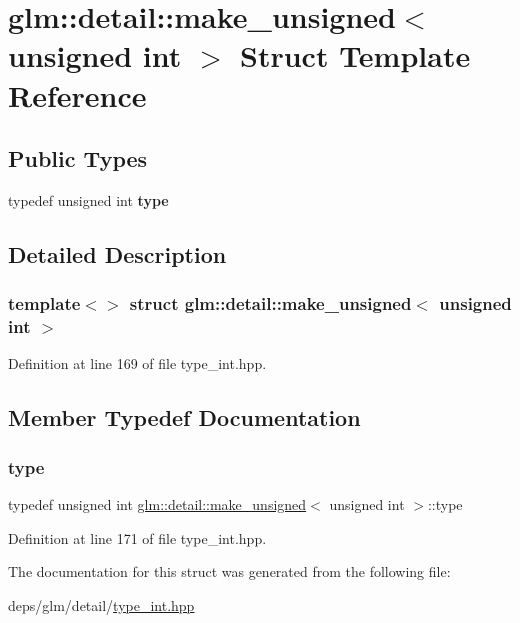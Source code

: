 \hypertarget{structglm_1_1detail_1_1make__unsigned_3_01unsigned_01int_01_4}{}\section{glm\+:\+:detail\+:\+:make\+\_\+unsigned$<$ unsigned int $>$ Struct Template Reference}
\label{structglm_1_1detail_1_1make__unsigned_3_01unsigned_01int_01_4}
\subsection*{Public Types}
\begin{DoxyCompactItemize}
\item 
\mbox{\label{structglm_1_1detail_1_1make__unsigned_3_01unsigned_01int_01_4_aea3e796456b317dd2247889d3fbb9d68}} 
typedef unsigned int {\bfseries type}
\end{DoxyCompactItemize}


\subsection{Detailed Description}
\subsubsection*{template$<$$>$\newline
struct glm\+::detail\+::make\+\_\+unsigned$<$ unsigned int $>$}



Definition at line 169 of file type\+\_\+int.\+hpp.



\subsection{Member Typedef Documentation}
\mbox{\label{structglm_1_1detail_1_1make__unsigned_3_01unsigned_01int_01_4_aea3e796456b317dd2247889d3fbb9d68}} 
\subsubsection{\texorpdfstring{type}{type}}
{\footnotesize\ttfamily typedef unsigned int \hyperlink{structglm_1_1detail_1_1make__unsigned}{glm\+::detail\+::make\+\_\+unsigned}$<$ unsigned int $>$\+::type}



Definition at line 171 of file type\+\_\+int.\+hpp.



The documentation for this struct was generated from the following file\+:\begin{DoxyCompactItemize}
\item 
deps/glm/detail/\hyperlink{type__int_8hpp}{type\+\_\+int.\+hpp}\end{DoxyCompactItemize}
